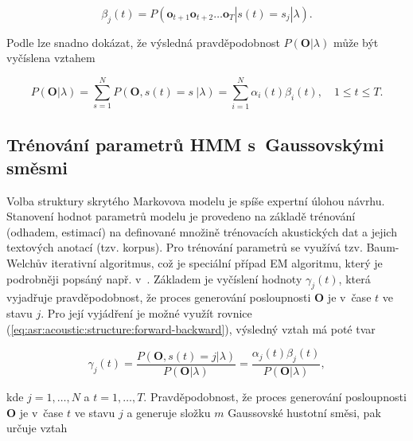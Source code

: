 \begin{equation}
  \beta_j\left(t\right) = P\left(\boldsymbol{o}_{t+1}\boldsymbol{o}_{t+2}\dots \boldsymbol{o}_T|s\left(t\right)=s_j|\lambda\right).
  \label{eq:asr:acoustic:structure:backward}
\end{equation}

\noindent Podle \cite{Psutka2006} lze snadno dokázat, že výsledná pravděpodobnost $P\left(\boldsymbol{O}|\lambda\right)$ může být vyčíslena vztahem

\begin{equation}
  P\left(\boldsymbol{O}|\lambda\right) = \sum_{s=1}^{N} P\left(\boldsymbol{O}, s\left(t\right) = s~| \lambda\right) = \sum_{i = 1}^{N} \alpha_{i}\left(t\right)\beta_{i}\left(t\right), \quad 1 \leq t \leq T.
  \label{eq:asr:acoustic:structure:forward-backward}
\end{equation}


\subsection{Trénování parametrů HMM s~Gaussovskými směsmi}
\label{chap:asr:acoustic:GMM}

Volba struktury skrytého Markovova modelu je spíše expertní úlohou návrhu. Stanovení hodnot parametrů modelu je provedeno na základě trénování (odhadem, estimací) na definované množině trénovacích akustických dat a jejich textových anotací (tzv. korpus). Pro trénování parametrů se využívá tzv. Baum-Welchův iterativní algoritmus, což je speciální případ EM algoritmu, který je podrobněji popsáný např. v~\cite{Holmes2001}. Základem je vyčíslení hodnoty $\gamma_{j}\left(t\right)$, která vyjadřuje pravděpodobnost, že proces generování posloupnosti $\boldsymbol{O}$ je v~čase $t$ ve stavu $j$. Pro její vyjádření je možné využít rovnice (\ref{eq:asr:acoustic:structure:forward-backward}), výsledný vztah má poté tvar

\begin{equation}
  \gamma_{j}\left(t\right) = \frac{P\left(\boldsymbol{O}, s\left(t\right)=j|\lambda\right)}{P\left(\boldsymbol{O}|\lambda\right)} = \frac{\alpha_{j}\left(t\right)\beta_{j}\left(t\right)}{P\left(\boldsymbol{O}|\lambda\right)} ,
   \label{eq:asr:acoustic:structure:gamma}
\end{equation}

\noindent kde $j = 1,\dots,N$ a $t = 1, \dots, T$. Pravděpodobnost, že proces generování posloupnosti $\boldsymbol{O}$ je v~čase $t$ ve stavu $j$ a generuje složku $m$ Gaussovské hustotní směsi, pak určuje vztah

